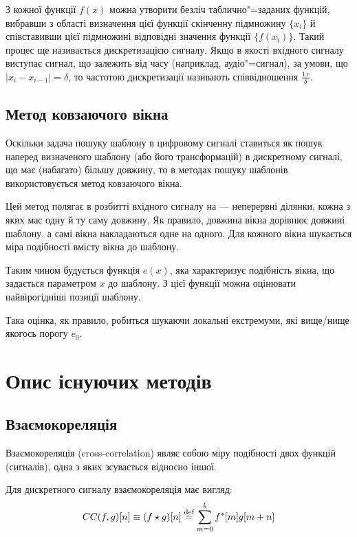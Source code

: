     З кожної функції $f(x)$ можна утворити безліч таблично"=заданих функцій, вибравши з області визначення цієї
    функції скінченну підмножину $\{x_i\}$ й співставивши цієї підмножині відповідні значення функції $\{f(x_i)\}$.
    Такий процес ще називається дискретизацією сигналу.
    Якщо в якості вхідного сигналу виступає сигнал, що залежить від часу (наприклад, аудіо"=сигнал), за умови, що $|
    x_i - x_{i-1}| = \delta$, то частотою дискретизації називають співвідношення $\frac{1\,c}{\delta}$.

    \subsection{Метод ковзаючого вікна}
    \label{ss:sliding-window}
        Оскільки задача пошуку шаблону в цифровому сигналі ставиться як пошук наперед визначеного шаблону (або його
        трансформацій) в дискретному сигналі, що має (набагато) більшу довжину, то в методах пошуку шаблонів
        використовується метод ковзаючого вікна.

        Цей метод полягає в розбитті вхідного сигналу на  --- неперервні ділянки, кожна з яких має
        одну й ту саму довжину.
        Як правило, довжина вікна дорівнює довжині шаблону, а самі вікна накладаються одне на одного.
        Для кожного вікна шукається міра подібності вмісту вікна до шаблону.

        Таким чином будується функція $e(x)$, яка характеризує подібність вікна, що задається параметром $x$ до
        шаблону.
        З цієї функції можна оцінювати найвірогідніші позиції шаблону.

        Така оцінка, як правило, робиться шукаючи локальні екстремуми, які вище/нище якогось порогу $e_{0}$.

\section{Опис існуючих методів}
    \subsection{Взаємокореляція}
        Взаємокореляція (cross-correlation) являє собою міру подібності двох функцій (сигналів), одна з яких
        зсувається відносно іншої.

        Для дискретного сигналу взаємокореляція має вигляд:
        \begin{equation}
            CC(f,g)[ n ] \equiv (f \star g)[ n ] \stackrel{\text{def}}{=} \sum\limits_{m=0}^{k} f^*[m] g[ m + n ]
        \end{equation}

